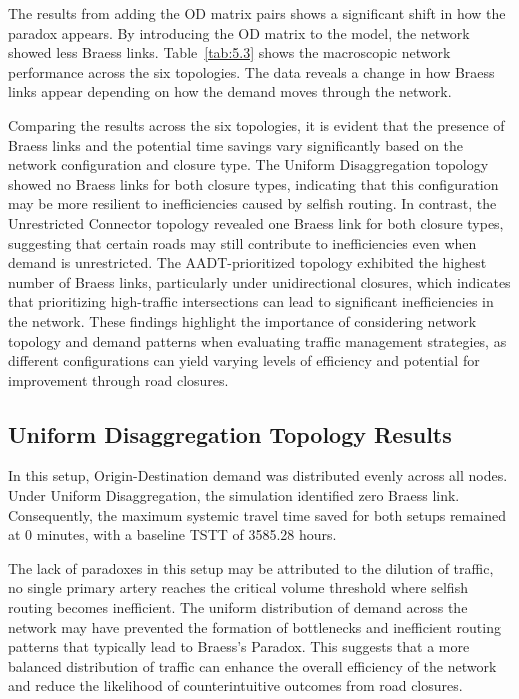 The results from adding the OD matrix pairs shows a significant shift in how the paradox appears. By introducing the OD matrix to the model, the network showed less Braess links. Table~\ref{tab:5.3} shows the macroscopic network performance across the six topologies. The data reveals a change in how Braess links appear depending on how the demand moves through the network.

Comparing the results across the six topologies, it is evident that the presence of Braess links and the potential time savings vary significantly based on the network configuration and closure type. The Uniform Disaggregation topology showed no Braess links for both closure types, indicating that this configuration may be more resilient to inefficiencies caused by selfish routing. In contrast, the Unrestricted Connector topology revealed one Braess link for both closure types, suggesting that certain roads may still contribute to inefficiencies even when demand is unrestricted. The AADT-prioritized topology exhibited the highest number of Braess links, particularly under unidirectional closures, which indicates that prioritizing high-traffic intersections can lead to significant inefficiencies in the network. These findings highlight the importance of considering network topology and demand patterns when evaluating traffic management strategies, as different configurations can yield varying levels of efficiency and potential for improvement through road closures.

\subsection{Uniform Disaggregation Topology Results}
\label{sec:uniform_disaggregation_results}

In this setup, Origin-Destination demand was distributed evenly across all nodes. Under Uniform Disaggregation, the simulation identified zero Braess link. Consequently, the maximum systemic travel time saved for both setups remained at 0 minutes, with a baseline TSTT of 3585.28 hours.

The lack of paradoxes in this setup may be attributed to the dilution of traffic, no single primary artery reaches the critical volume threshold where selfish routing becomes inefficient. The uniform distribution of demand across the network may have prevented the formation of bottlenecks and inefficient routing patterns that typically lead to Braess's Paradox. This suggests that a more balanced distribution of traffic can enhance the overall efficiency of the network and reduce the likelihood of counterintuitive outcomes from road closures.

